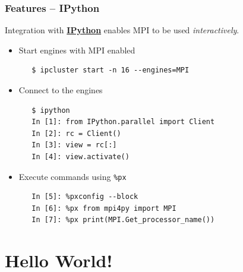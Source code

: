 \documentclass{beamer}
\newcommand{\Cpp}{C\protect\raisebox{.18ex}{++}\xspace}
\begin{document}


\begin{frame}[fragile]
  \frametitle{Features -- IPython}
  Integration with \href{http://ipython.scipy.org}{\textbf{IPython}}
  enables MPI to be used \emph{interactively}.
  \begin{itemize}
  \item Start engines with MPI enabled
\begin{verbatim}
   $ ipcluster start -n 16 --engines=MPI
\end{verbatim}
  \item Connect to the engines
\begin{verbatim}
   $ ipython
   In [1]: from IPython.parallel import Client
   In [2]: rc = Client()
   In [3]: view = rc[:]
   In [4]: view.activate()
\end{verbatim}
  \item Execute commands using \texttt{\%px}
\begin{verbatim}
   In [5]: %pxconfig --block
   In [6]: %px from mpi4py import MPI
   In [7]: %px print(MPI.Get_processor_name())
\end{verbatim}
  \end{itemize}
\end{frame}


\section{Hello World!}
\end{document}
